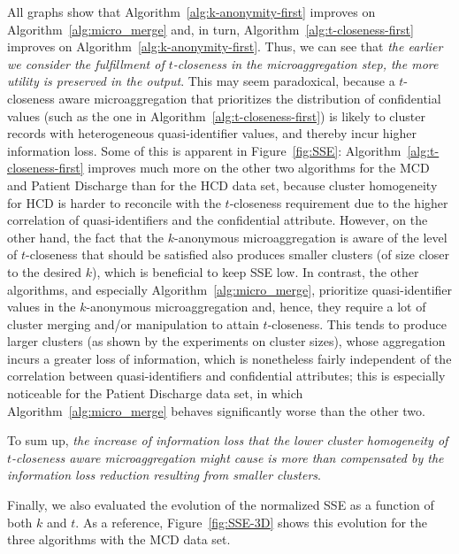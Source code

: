 \documentclass[10pt,journal,compsoc]{IEEEtran}
\theoremstyle{definition}
\theoremstyle{plain}
\begin{document}
All graphs show that Algorithm~\ref{alg:k-anonymity-first} 
improves on Algorithm~\ref{alg:micro_merge} and, in turn, 
Algorithm~\ref{alg:t-closeness-first} improves 
on Algorithm~\ref{alg:k-anonymity-first}.
Thus, we can see that {\em the earlier we consider
the fulfillment of $t$-closeness in the microaggregation step, the
more utility is preserved in the output}. This may seem paradoxical, 
because a $t$-closeness aware microaggregation that prioritizes 
the distribution of confidential values 
(such as the one in Algorithm~\ref{alg:t-closeness-first})
is likely to cluster records with heterogeneous quasi-identifier values, 
and thereby incur higher information loss. 
Some of this is apparent in Figure~\ref{fig:SSE}: 
Algorithm~\ref{alg:t-closeness-first} improves much more on
the other two algorithms for the MCD and Patient Discharge than for the HCD data set,
because cluster homogeneity for HCD is harder to 
reconcile with the $t$-closeness requirement due to the higher
correlation of quasi-identifiers and the confidential attribute.
However, on the other hand, the fact that
the $k$-anonymous microaggregation is aware of the level of $t$-closeness that
should be satisfied also produces smaller clusters (of size closer 
to the desired $k$),
which is beneficial to keep SSE low.
In contrast, the other algorithms, and especially 
Algorithm~\ref{alg:micro_merge}, prioritize
quasi-identifier values in the $k$-anonymous microaggregation and, 
hence, they require a lot of cluster merging and/or manipulation 
to attain $t$-closeness.
This tends to produce larger clusters (as shown by the experiments
 on cluster sizes), 
whose aggregation incurs a greater loss of information, 
which is nonetheless fairly independent of the correlation
between quasi-identifiers and confidential attributes;
this is especially noticeable for the Patient Discharge data set,
in which Algorithm~\ref{alg:micro_merge} behaves significantly
worse than the other two.

To sum up, {\em the increase of information loss that the lower cluster
homogeneity of $t$-closeness aware microaggregation might cause
is more than compensated by the information loss reduction 
resulting from smaller clusters}.

Finally, we also evaluated the evolution of the normalized SSE as a function of 
both $k$ and $t$. As a reference, Figure~\ref{fig:SSE-3D} shows 
this evolution for the three algorithms with the MCD data set.
\end{document}
